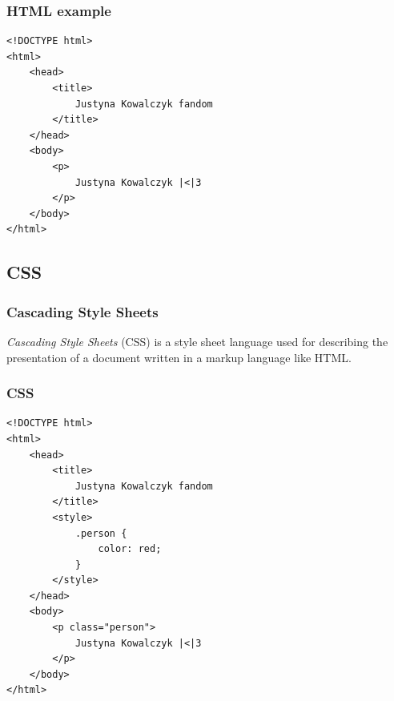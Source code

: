 \begin{frame}[fragile]
    \frametitle{HTML example}
    \begin{verbatim}
<!DOCTYPE html>
<html>
    <head>
        <title>
            Justyna Kowalczyk fandom
        </title>
    </head>
    <body>
        <p>
            Justyna Kowalczyk |<|3
        </p>
    </body>
</html>
    \end{verbatim}
\end{frame}

\subsection{CSS}

\begin{frame}
        \frametitle{Cascading Style Sheets}
        \begin{definition}
            \emph{Cascading Style Sheets} (CSS) is a style sheet language used for describing the presentation of a document written in a markup language like HTML.
        \end{definition}
\end{frame}

\begin{frame}[fragile]
    \frametitle{CSS}
    \begin{verbatim}
<!DOCTYPE html>
<html>
    <head>
        <title>
            Justyna Kowalczyk fandom
        </title>
        <style>
            .person {
                color: red;
            }
        </style>
    </head>
    <body>
        <p class="person">
            Justyna Kowalczyk |<|3
        </p>
    </body>
</html>
    \end{verbatim}
\end{frame}

